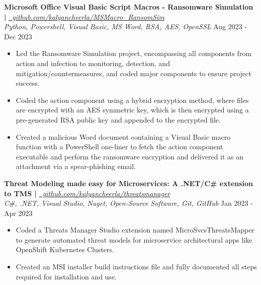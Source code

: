 \documentclass[a4paper]{article}
\begin{document}
{\textbf{Microsoft Office Visual Basic Script Macros - Ransomware Simulation |}}
\href{https://github.com/kalyancheerla/MSMacro\_RansomSim}{\small\sl~github.com/kalyancheerla/MSMacro\_RansomSim}\\
\vspace*{-.5mm}
{\small {\sl Python, Powershell, Visual Basic, MS Word, RSA, AES, OpenSSL} \hfill Aug 2023 - Dec 2023}\\
\vspace*{-2.5mm}
\begin{itemize} \itemsep -1mm
	\item Led the Ransomware Simulation project, encompassing all components from action and infection to monitoring, detection, and mitigation/countermeasures, and coded major components to ensure project success.
	\item Coded the action component using a hybrid encryption method, where files are encrypted with an AES symmetric key, which is then encrypted using a pre-generated RSA public key and appended to the encrypted file.
	\item Created a malicious Word document containing a Visual Basic macro function with a PowerShell one-liner to fetch the action component executable and perform the ransomware encryption and delivered it as an attachment via a spear-phishing email.
\end{itemize}
\vspace*{-2mm}

{\textbf{Threat Modeling made easy for Microservices: A .NET/C\# extension to TMS |}}
\href{https://github.com/kalyancheerla/threatsmanager/tree/MicroSvcsThreatsMapper\_Tool/Tools/MicroSvcsThreatsMapper}{\small\sl~github.com/kalyancheerla/threatsmanager}\\
\vspace*{-.5mm}
{\small {\sl C\#, .NET, Visual Studio, Nuget, Open-Source Software, Git, GitHub} \hfill Jan 2023 - Apr 2023}\\
\vspace*{-2.5mm}
\begin{itemize} \itemsep -1mm
	\item Coded a Threats Manager Studio extension named MicroSvcsThreatsMapper to generate automated threat models for microservice architectural apps like OpenShift Kubernetes Clusters.
	\item Created an MSI installer build instructions file and fully documented all steps required for installation and use.
\end{itemize}
\vspace*{-2mm}
\end{document}
